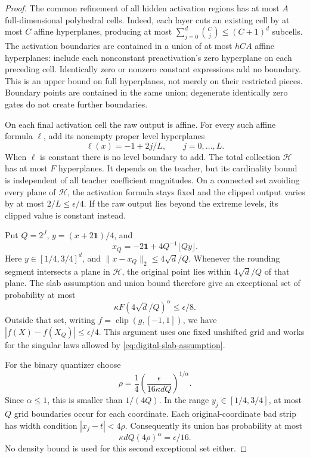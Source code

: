 \begin{proof}
The common refinement of all hidden activation regions has at most
$A$ full-dimensional polyhedral cells. Indeed, each layer cuts an
existing cell by at most $C$ affine hyperplanes, producing at most
$\sum_{j=0}^d\binom Cj\le(C+1)^d$ subcells. The activation boundaries
are contained in a union of at most $hCA$ affine hyperplanes: include
each nonconstant preactivation's zero hyperplane on each preceding
cell. Identically zero or nonzero constant expressions add no boundary.
This is an upper bound on full hyperplanes, not merely on their
restricted pieces. Boundary points are contained in the same union;
degenerate identically zero gates do not create further boundaries.

On each final activation cell the raw output is affine. For every
such affine formula $\ell$, add its nonempty proper level hyperplanes
\[
 \ell(x)=-1+2j/L,\qquad j=0,\ldots,L.
\]
When $\ell$ is constant there is no level boundary to add. The total
collection $\mathcal H$ has at most $F$ hyperplanes. It depends on
the teacher, but its cardinality bound is independent of all teacher
coefficient magnitudes. On a connected set avoiding every plane of
$\mathcal H$, the activation formula stays fixed and the clipped
output varies by at most $2/L\le\epsilon/4$. If the raw output lies
beyond the extreme levels, its clipped value is constant instead.

Put $Q=2^J$, $y=(x+2\mathbf1)/4$, and
\[
 x_Q=-2\mathbf1+4Q^{-1}\lfloor Qy\rfloor.
\]
Here $y\in[1/4,3/4]^d$, and
$\|x-x_Q\|_2\le4\sqrt d/Q$.
Whenever the rounding segment intersects a plane in $\mathcal H$,
the original point lies within $4\sqrt d/Q$ of that plane.
The slab assumption and union bound therefore give an exceptional
set of probability at most
\[
 \kappa F(4\sqrt d/Q)^\alpha\le\epsilon/8.
\]
Outside that set, writing $f=\operatorname{clip}(g,[-1,1])$,
we have $|f(X)-f(X_Q)|\le\epsilon/4$. This argument uses one fixed
unshifted grid and works for the singular laws allowed by
\eqref{eq:digital-slab-assumption}.

For the binary quantizer choose
\[
 \rho=\frac14\left(\frac{\epsilon}{16\kappa d Q}\right)^{1/\alpha}.
\]
Since $\alpha\le1$, this is smaller than $1/(4Q)$.
In the range $y_j\in[1/4,3/4]$, at most $Q$ grid boundaries occur
for each coordinate. Each original-coordinate bad strip has width
condition $|x_j-t|<4\rho$. Consequently its union has probability
at most
\[
 \kappa dQ(4\rho)^\alpha=\epsilon/16.
\]
No density bound is used for this second exceptional set either.


\end{proof}
